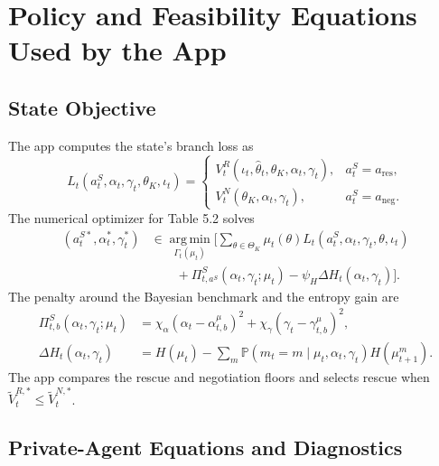 \documentclass[ecta,nameyear,final,supplement]{econsocart}
\numberwithin{equation}{section}
\newcommand{\Prob}{\mathbb{P}}
\newcommand{\ThetaK}{\Theta_K}
\newcommand{\thetak}{\theta_K}
\newcommand{\argmin}{\operatorname*{arg\,min}}
\begin{document}
\section{Policy and Feasibility Equations Used by the App}

\subsection{State Objective}

The app computes the state's branch loss as
\begin{equation}
L_t(a_t^S,\alpha_t,\gamma_t,\thetak,\iota_t)
=
\begin{cases}
V_t^R(\iota_t,\widehat\theta_t,\thetak,\alpha_t,\gamma_t),
&a_t^S=a_{\mathrm{res}},\\
V_t^N(\thetak,\alpha_t,\gamma_t),
&a_t^S=a_{\mathrm{neg}}.
\end{cases}
\label{eq:app-state-loss}
\end{equation}
The numerical optimizer for Table 5.2 solves
\begin{equation}
\begin{aligned}
(a_t^{S\ast},\alpha_t^\ast,\gamma_t^\ast)
&\in
\argmin_{\Gamma_t(\mu_t)}
\Biggl[
\sum_{\theta\in\ThetaK}\mu_t(\theta)
L_t(a_t^S,\alpha_t,\gamma_t,\theta,\iota_t)\\
&\qquad
+\Pi_{t,a^S}^S(\alpha_t,\gamma_t;\mu_t)
-\psi_H\Delta H_t(\alpha_t,\gamma_t)
\Biggr].
\end{aligned}
\label{eq:app-state-objective}
\end{equation}
The penalty around the Bayesian benchmark and the entropy gain are
\begin{align}
\Pi_{t,b}^S(\alpha_t,\gamma_t;\mu_t)
&=
\chi_\alpha(\alpha_t-\alpha_{t,b}^{\mu})^2
+\chi_\gamma(\gamma_t-\gamma_{t,b}^{\mu})^2,
\label{eq:app-deviation}\\
\Delta H_t(\alpha_t,\gamma_t)
&=
H(\mu_t)
-\sum_m
\Prob(m_t=m\mid\mu_t,\alpha_t,\gamma_t)H(\mu_{t+1}^m).
\label{eq:app-deltaH}
\end{align}
The app compares the rescue and negotiation floors and selects rescue when
$\widetilde V_t^{R,\ast}\le \widetilde V_t^{N,\ast}$.

\subsection{Private-Agent Equations and Diagnostics}
\end{document}
